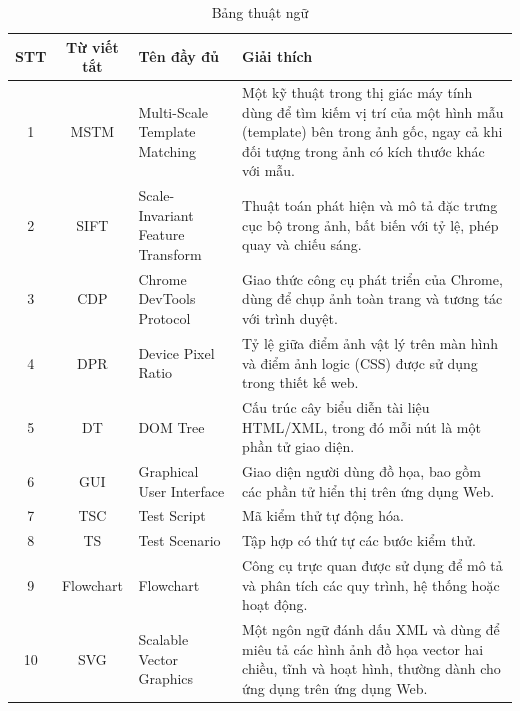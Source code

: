 \documentclass[a4paper, 12pt]{report}
\begin{document}
\clearpage
\begin{table}[h]
    \centering
    \caption*{Bảng thuật ngữ}
    \renewcommand{\arraystretch}{1.5} 
    \begin{tabular}{|c|c|>{\centering\arraybackslash}p{4.5cm}|>{\centering\arraybackslash}p{7cm}|}
        \hline
        \textbf{STT} & \textbf{Từ viết tắt} & \textbf{Tên đầy đủ} & \textbf{Giải thích} \\  
        \hline
        1  & MSTM  & Multi-Scale Template Matching   & Một kỹ thuật trong thị giác máy tính dùng để tìm kiếm vị trí của một hình mẫu (template) bên trong ảnh gốc, ngay cả khi đối tượng trong ảnh có kích thước khác với mẫu. \\  
        \hline
        2  & SIFT  & Scale-Invariant Feature Transform   & Thuật toán phát hiện và mô tả đặc trưng cục bộ trong ảnh, bất biến với tỷ lệ, phép quay và chiếu sáng. \\  
        \hline
        3  & CDP    & Chrome DevTools Protocol     & Giao thức công cụ phát triển của Chrome, dùng để chụp ảnh toàn trang và tương tác với trình duyệt. \\  
        \hline
        4  & DPR   & Device Pixel Ratio & Tỷ lệ giữa điểm ảnh vật lý trên màn hình và điểm ảnh logic (CSS) được sử dụng trong thiết kế web.\\  
        \hline
        5  & DT   & DOM Tree & Cấu trúc cây biểu diễn tài liệu HTML/XML, trong đó mỗi nút là một phần tử giao diện. \\  
        \hline
        6  & GUI   & Graphical User Interface & Giao diện người dùng đồ họa, bao gồm các phần tử hiển thị trên ứng dụng Web. \\  
        \hline
        7  & TSC   & Test Script & Mã kiểm thử tự động hóa. \\  
        \hline
        8  & TS   & Test Scenario & Tập hợp có thứ tự các bước kiểm thử. \\  
        \hline
        9  & Flowchart   & Flowchart & Công cụ trực quan được sử dụng để mô tả và phân tích các quy trình, hệ thống hoặc hoạt động. \\  
        \hline
        10  & SVG   & Scalable Vector Graphics & Một ngôn ngữ đánh dấu XML và dùng để miêu tả các hình ảnh đồ họa vector hai chiều, tĩnh và hoạt hình, thường dành cho ứng dụng trên ứng dụng Web. \\  
        \hline
    \end{tabular}
    \label{tab:test_terms}
\end{table}
\newpage
\end{document}
